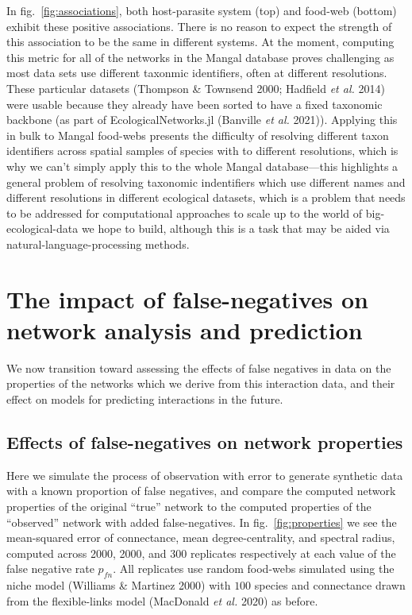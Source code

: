 \documentclass[10pt,oneside]{article}
\begin{document}
In fig.~\ref{fig:associations}, both host-parasite system (top) and
food-web (bottom) exhibit these positive associations. There is no
reason to expect the strength of this association to be the same in
different systems. At the moment, computing this metric for all of the
networks in the Mangal database proves challenging as most data sets use
different taxonmic identifiers, often at different resolutions. These
particular datasets (Thompson \& Townsend 2000; Hadfield \emph{et al.}
2014) were usable because they already have been sorted to have a fixed
taxonomic backbone (as part of EcologicalNetworks.jl (Banville \emph{et
al.} 2021)). Applying this in bulk to Mangal food-webs presents the
difficulty of resolving different taxon identifiers across spatial
samples of species with to different resolutions, which is why we can't
simply apply this to the whole Mangal database---this highlights a
general problem of resolving taxonomic indentifiers which use different
names and different resolutions in different ecological datasets, which
is a problem that needs to be addressed for computational approaches to
scale up to the world of big-ecological-data we hope to build, although
this is a task that may be aided via natural-language-processing
methods.

\hypertarget{the-impact-of-false-negatives-on-network-analysis-and-prediction}{%
\section{The impact of false-negatives on network analysis and
prediction}\label{the-impact-of-false-negatives-on-network-analysis-and-prediction}}

We now transition toward assessing the effects of false negatives in
data on the properties of the networks which we derive from this
interaction data, and their effect on models for predicting interactions
in the future.

\hypertarget{effects-of-false-negatives-on-network-properties}{%
\subsection{Effects of false-negatives on network
properties}\label{effects-of-false-negatives-on-network-properties}}

Here we simulate the process of observation with error to generate
synthetic data with a known proportion of false negatives, and compare
the computed network properties of the original ``true'' network to the
computed properties of the ``observed'' network with added
false-negatives. In fig.~\ref{fig:properties} we see the mean-squared
error of connectance, mean degree-centrality, and spectral radius,
computed across 2000, 2000, and 300 replicates respectively at each
value of the false negative rate \(p_{fn}\). All replicates use random
food-webs simulated using the niche model (Williams \& Martinez 2000)
with \(100\) species and connectance drawn from the flexible-links model
(MacDonald \emph{et al.} 2020) as before.
\end{document}
